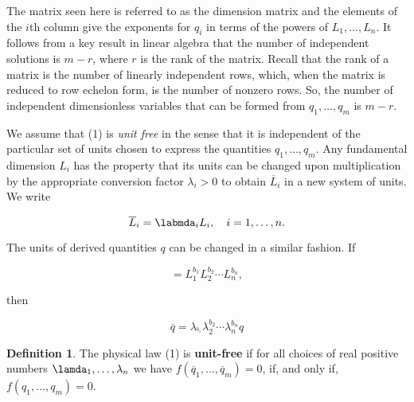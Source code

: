\documentclass{article}
\theoremstyle{definition}
\newtheorem{definition}{Definition}[section]
\theoremstyle{remark}
\theoremstyle{definition}
\begin{document}
\noindent The matrix seen here is referred to as the dimension matrix and the elements of the $i$th column give the exponents for $q_i$ in terms of the powers of $L_1,\dots,L_n$. It follows from a key result in linear algebra that the number of independent solutions is $m-r$, where $r$ is the rank of the matrix. Recall that the rank of a matrix is the number of linearly independent rows, which, when the matrix is reduced to row echelon form, is the number of nonzero rows. So, the number of independent dimensionless variables that can be formed from $q_1,\dots,q_m$ is $m-r$.\par We assume that (1) is \textit{unit free} in the sense that it is independent of the particular set of units chosen to express the quantities $q_1,\dots,q_m$. Any fundamental dimension $L_i$ has the property that its units can be changed upon multiplication by the appropriate conversion factor $\lambda_i>0$ to obtain $\overline{L}_i$ in a new system of units. We write

\begin{equation*}
    \overline{L}_i=\labmda_i L_i,\quad i=1,\dots,n.
\end{equation*}

The units of derived quantities $q$ can be changed in a similar fashion. If

\begin{equation*}
    [q]=L_1^{b_1}L_2^{b_2}\cdots L_n^{b_n},
\end{equation*}

\noindent then

\begin{equation*}
    \overline{q}=\lambda_^{b_1}\lambda_2^{b_2}\cdots\lambda_n^{b_n}q
\end{equation*}


\begin{definition}
    The physical law (1) is \textbf{unit-free} if for all choices of real positive numbers $\lamda_1,\dots,\lambda_n$ we have $f(\overline{q}_1,\dots,\overline{q}_m)=0$, if, and only if, $f(q_1,\dots,q_m)=0$.
\end{definition}

\newpage
\end{document}
